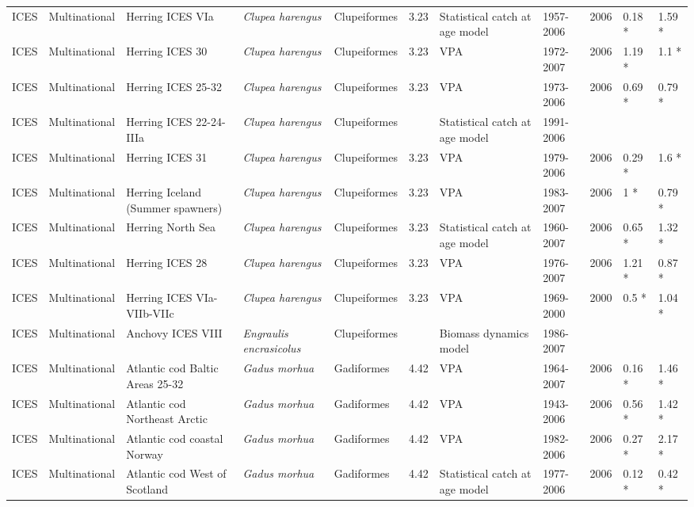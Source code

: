 \begin{longtable}{p{1.5cm}p{1.5cm}p{3cm}p{3cm}p{2.5cm}p{0.9cm}p{1.4cm}p{0.9cm}p{0.9cm}p{0.9cm}p{1cm}}
  ICES & Multinational & Herring ICES VIa & \textit{Clupea harengus} & Clupeiformes & 3.23 & Statistical catch at age model & 1957-2006 & 2006 & 0.18 * & 1.59 * \\ 
  ICES & Multinational & Herring ICES 30 & \textit{Clupea harengus} & Clupeiformes & 3.23 & VPA & 1972-2007 & 2006 & 1.19 * & 1.1 * \\ 
  ICES & Multinational & Herring ICES 25-32 & \textit{Clupea harengus} & Clupeiformes & 3.23 & VPA & 1973-2006 & 2006 & 0.69 * & 0.79 * \\ 
  ICES & Multinational & Herring ICES 22-24-IIIa & \textit{Clupea harengus} & Clupeiformes &  & Statistical catch at age model & 1991-2006 &  &  &  \\ 
  ICES & Multinational & Herring ICES 31 & \textit{Clupea harengus} & Clupeiformes & 3.23 & VPA & 1979-2006 & 2006 & 0.29 * & 1.6 * \\ 
  ICES & Multinational & Herring Iceland (Summer spawners) & \textit{Clupea harengus} & Clupeiformes & 3.23 & VPA & 1983-2007 & 2006 & 1 * & 0.79 * \\ 
  ICES & Multinational & Herring North Sea & \textit{Clupea harengus} & Clupeiformes & 3.23 & Statistical catch at age model & 1960-2007 & 2006 & 0.65 * & 1.32 * \\ 
  ICES & Multinational & Herring ICES 28 & \textit{Clupea harengus} & Clupeiformes & 3.23 & VPA & 1976-2007 & 2006 & 1.21 * & 0.87 * \\ 
  ICES & Multinational & Herring ICES VIa-VIIb-VIIc & \textit{Clupea harengus} & Clupeiformes & 3.23 & VPA & 1969-2000 & 2000 & 0.5 * & 1.04 * \\ 
  ICES & Multinational & Anchovy ICES VIII & \textit{Engraulis encrasicolus} & Clupeiformes &  & Biomass dynamics model & 1986-2007 &  &  &  \\ 
  ICES & Multinational & Atlantic cod Baltic Areas 25-32 & \textit{Gadus morhua} & Gadiformes & 4.42 & VPA & 1964-2007 & 2006 & 0.16 * & 1.46 * \\ 
  ICES & Multinational & Atlantic cod Northeast Arctic & \textit{Gadus morhua} & Gadiformes & 4.42 & VPA & 1943-2006 & 2006 & 0.56 * & 1.42 * \\ 
  ICES & Multinational & Atlantic cod coastal Norway & \textit{Gadus morhua} & Gadiformes & 4.42 & VPA & 1982-2006 & 2006 & 0.27 * & 2.17 * \\ 
  ICES & Multinational & Atlantic cod West of Scotland & \textit{Gadus morhua} & Gadiformes & 4.42 & Statistical catch at age model & 1977-2006 & 2006 & 0.12 * & 0.42 * \\ 

\end{longtable}
